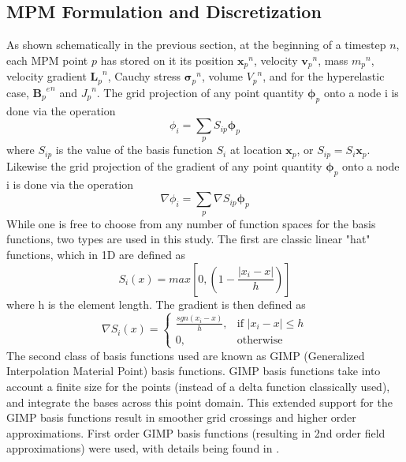\subsection{MPM Formulation and Discretization}
As shown schematically in the previous section, at the beginning of a timestep $n$, each MPM point $p$ has stored on it its position ${\bm{x}_p}^n$, velocity ${\bm{v}_p}^n$, mass ${m_p}^n$, velocity gradient ${\bm{L}_p}^n$, Cauchy stress ${\bm{\sigma}_p}^n$, volume ${V_p}^n$, and for the hyperelastic case, ${{\bm{B}_p}^e}^n$ and ${J_p}^n$. The grid projection of any point quantity $\bm{\phi}_p$ onto a node i is done via the operation
\begin{equation}
\phi_i=\sum_pS_{ip}{\bm{\phi}}_p\label{projection_value}
\end{equation}
where $S_{ip}$ is the value of the basis function $S_i$ at location $\bm{x}_p$, or $S_{ip}=S_i{\bm{x}_p}$. Likewise the grid projection of the gradient of any point quantity $\bm{\phi}_p$ onto a node i is done via the operation
\begin{equation}
\nabla \phi_i=\sum_p \nabla S_{ip}{\bm{\phi}}_p \label{projection_gradient}
\end{equation}
While one is free to choose from any number of function spaces for the basis functions, two types are used in this study. The first are classic linear "hat" functions, which in 1D are defined as
\begin{equation}
S_i(x)=max[0,(1-\frac{|x_i-x|}{h})]\label{linear_basis}
\end{equation}
where h is the element length. The gradient is then defined as
\begin{equation}
	\nabla S_i(x)=
\begin{cases}
	\frac{sgn(x_i-x)}{h},     & \text{if } |x_i-x| \leq h \\
	0,						 & \text{otherwise}
\end{cases}
\label{linear_basis_gradient}
\end{equation}
The second class of basis functions used are known as GIMP (Generalized Interpolation Material Point) basis functions. GIMP basis functions take into account a finite size for the points (instead of a delta function classically used), and integrate the bases across this point domain. This extended support for the GIMP basis functions result in smoother grid crossings and higher order approximations. First order GIMP basis functions (resulting in 2nd order field approximations) were used, with details being found in \cite{Bardenhagen:2004}.

